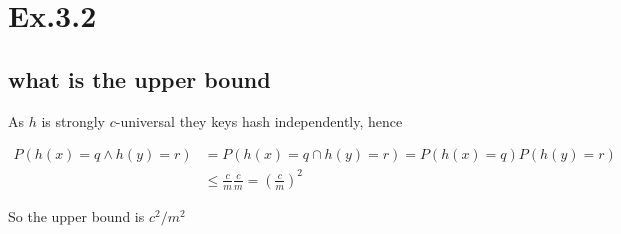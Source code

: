 \section*{Ex.3.2}
\subsection*{what is the upper bound}

As $h$ is strongly $c$-universal they keys hash independently, hence

\begin{align*}
P(h(x)=q \land h(y)=r) &= P(h(x)=q \cap h(y)=r) = P(h(x)=q) P(h(y)=r) \\
                       &\leq \frac{c}{m} \frac{c}{m} = \left(\frac{c}{m}\right)^2
\end{align*}

So the upper bound is $c^2/m^2$